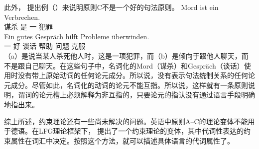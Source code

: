 此外， \citet[]{Fanselow92b}提出例（）来说明原则C不是一个好的句法原则。
\eal
\ex 
\gll Mord ist ein Verbrechen.\\
     谋杀 是 一 犯罪\\
\ex 
\gll Ein gutes Gespräch hilft Probleme überwinden.\\
     一 好 谈话 帮助 问题 克服\\
\zl
（a）是说当某人杀死他人时，这是一项犯罪，而（b）是倾向于跟他人聊天，而不是跟自己聊天。在这些句子中，名词化的Mord（谋杀）和Gespräch（谈话）使用时没有带上原始动词的任何论元成分。所以说，没有表示句法统制关系的任何论元成分。尽管如此，名词化的动词的论元不能互指。所以说，这样就有一条原则说明，谓词的论元槽上必须解释为非互指的，只要论元的指认没有通过语言手段明确地指出来。

综上所述，约束理论还有一些尚未解决的问题。英语中原则A--C的\hpsgc 理论变体不能用于德语\citep[\S~20]{Mueller99a}。在LFG理论框架下， \citet{Dalrymple93a}提出了一个约束理论的变体，其中代词性表达的约束属性在词汇中决定。按照这个方法，就可以描述具体语言的代词属性了。

